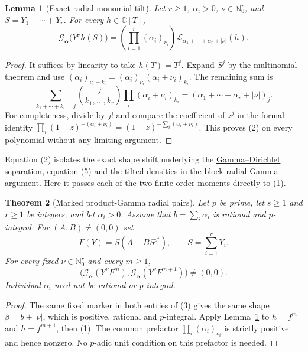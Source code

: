 \documentclass[11pt]{article}
\newtheorem{theorem}{Theorem}
\newtheorem{lemma}[theorem]{Lemma}
\newcommand{\C}{\mathbb C}
\newcommand{\N}{\mathbb N}
\newcommand{\Lbeta}{\mathcal L}
\begin{document}
\begin{lemma}[Exact radial monomial tilt]\label{lem:radial-tilt}
Let $r\ge1$, $\alpha_i>0$, $\nu\in\N_0^r$, and
$S=Y_1+\cdots+Y_r$. For every $h\in\C[T]$,
\[
 \mathcal G_{\boldsymbol\alpha}\bigl(Y^\nu h(S)\bigr)
 =\left(\prod_{i=1}^r(\alpha_i)_{\nu_i}\right)
    \Lbeta_{\alpha_1+\cdots+\alpha_r+|\nu|}(h).
 \tag{2}
\]
\end{lemma}
\begin{proof}
It suffices by linearity to take $h(T)=T^j$.
Expand $S^j$ by the multinomial theorem and use
$(\alpha_i)_{\nu_i+k_i}=(\alpha_i)_{\nu_i}
(\alpha_i+\nu_i)_{k_i}$.
The remaining sum is
\[
 \sum_{k_1+\cdots+k_r=j}
 \binom{j}{k_1,\ldots,k_r}\prod_i(\alpha_i+\nu_i)_{k_i}
 =(\alpha_1+\cdots+\alpha_r+|\nu|)_j.
\]
For completeness, divide by $j!$ and compare the coefficient of $z^j$
in the formal identity
$\prod_i(1-z)^{-(\alpha_i+\nu_i)}
=(1-z)^{-\sum_i(\alpha_i+\nu_i)}$.
This proves (2) on every polynomial without any limiting argument.
\end{proof}

Equation (2) isolates the exact shape shift underlying the
\href{STATUS_AND_LITERATURE.tex}{Gamma--Dirichlet separation, equation (5)}
and the tilted densities in the
\href{COUPLED_BLOCK_PERIODS.tex}{block-radial Gamma argument}.
Here it passes each of the two finite-order moments directly to (1).

\begin{theorem}[Marked product-Gamma radial pairs]\label{thm:marked-gamma}
Let $p$ be prime, let $s\ge1$ and $r\ge1$ be integers, and let $\alpha_i>0$.
Assume that $b=\sum_i\alpha_i$ is rational and $p$-integral.
For $(A,B)\ne(0,0)$ set
\[
 F(Y)=S(A+BS^{p^s}),\qquad S=\sum_{i=1}^rY_i .
\]
For every fixed $\nu\in\N_0^r$ and every $m\ge1$,
\[
 \bigl(\mathcal G_{\boldsymbol\alpha}(Y^\nu F^m),
       \mathcal G_{\boldsymbol\alpha}(Y^\nu F^{m+1})\bigr)
 \ne(0,0).
 \tag{3}
\]
Individual $\alpha_i$ need not be rational or $p$-integral.
\end{theorem}
\begin{proof}
The same fixed marker in both entries of (3) gives the same shape
$\beta=b+|\nu|$, which is positive, rational and $p$-integral.
Apply Lemma~\ref{lem:radial-tilt} to $h=f^m$ and $h=f^{m+1}$,
then (1). The common prefactor
$\prod_i(\alpha_i)_{\nu_i}$ is strictly positive and hence nonzero.
No $p$-adic unit condition on this prefactor is needed.
\end{proof}
\end{document}
